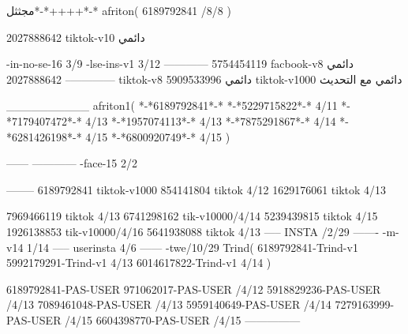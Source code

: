 مجثثل*-*++++*-*
afriton(
6189792841 /8/8
)

2027888642 tiktok-v10
دائمي

-in-no-se-16 3/9
-lse-ins-v1 3/12
------------
5754454119 facbook-v8
دائمي
--------------
2027888642 tiktok-v8
دائمي
5909533996 tiktok-v1000
دائمي مع التحديث

__________
afriton1(
*-*6189792841*-*
*-*5229715822*-* 4/11
*-*7179407472*-* 4/13
*-*1957074113*-* 4/13
*-*7875291867*-* 4/14
*-*6281426198*-* 4/15
*-*6800920749*-* 4/15
)


------
------------
-face-15 2/2

--------
6189792841 tiktok-v1000
854141804 tiktok 4/12
1629176061 tiktok 4/13

7969466119 tiktok 4/13
6741298162 tik-v10000/4/14
5239439815 tiktok 4/15
1926138853 tik-v10000/4/16
5641938088 tiktok 4/13
-----
 INSTA /2/29
-------
-m-v14 1/14
-----
userinsta 4/6
------
-twe/10/29
Trind(
6189792841-Trind-v1 
5992179291-Trind-v1  4/13
6014617822-Trind-v1  4/14
)

6189792841-PAS-USER
971062017-PAS-USER /4/12
5918829236-PAS-USER /4/13
7089461048-PAS-USER /4/13
5959140649-PAS-USER /4/14
7279163999-PAS-USER /4/15
6604398770-PAS-USER /4/15
    ---------------
